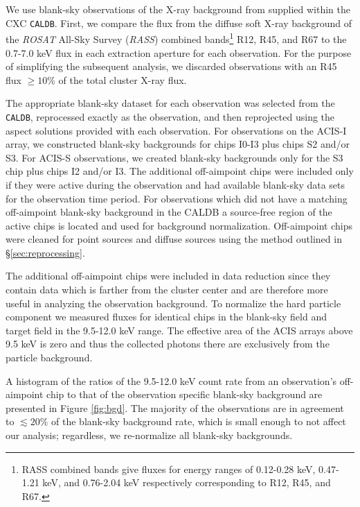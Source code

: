 \documentclass{emulateapj}
\begin{document}
We use blank-sky observations of the X-ray background from
\cite{2001ApJ...562L.153M} supplied within the CXC {\tt CALDB}. First, we
compare the flux from the diffuse soft X-ray background of the
{\textit{ROSAT}} All-Sky Survey ({\textit{RASS}}) combined
bands\footnote{RASS combined bands give fluxes for energy ranges of
0.12-0.28 keV, 0.47-1.21 keV, and 0.76-2.04 keV respectively
corresponding to R12, R45, and R67.} R12, R45, and R67 to the 0.7-7.0
keV flux in each extraction aperture for each observation. For the
purpose of simplifying the subsequent analysis, we discarded
observations with an R45 flux $\geq 10\%$ of the total cluster X-ray
flux.

The appropriate blank-sky dataset for each observation was
selected from the {\tt CALDB}, reprocessed exactly as the
observation, and then reprojected using the aspect solutions provided
with each observation. For observations on the ACIS-I array, we
constructed blank-sky backgrounds for chips I0-I3 plus chips S2 and/or
S3. For ACIS-S observations, we created blank-sky backgrounds only for
the S3 chip plus chips I2 and/or I3. The additional off-aimpoint
chips were included only if they were active during the observation
and had available blank-sky data sets for the observation time
period. For observations which did not have a matching off-aimpoint
blank-sky background in the CALDB a source-free region of the active
chips is located and used for background normalization. Off-aimpoint
chips were cleaned for point sources and diffuse sources using the
method outlined in \S\ref{sec:reprocessing}.

The additional off-aimpoint chips were included in data reduction
since they contain data which is farther from the cluster center and
are therefore more useful in analyzing the observation background. To
normalize the hard particle component we measured fluxes for identical
chips in the blank-sky field and target field in the 9.5-12.0 keV
range. The effective area of the ACIS arrays above 9.5 keV is zero and
thus the collected photons there are exclusively from the particle
background. 

A histogram of the ratios of the 9.5-12.0 keV count rate from an
observation's off-aimpoint chip to that of the observation specific
blank-sky background are presented in Figure \ref{fig:bgd}. The
majority of the observations are in agreement to $\lesssim 20\%$ of
the blank-sky background rate, which is small enough to not affect our
analysis; regardless, we re-normalize all blank-sky backgrounds. 
\end{document}

